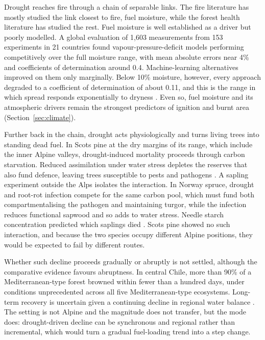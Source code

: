\documentclass[11pt,a4paper]{article}
\begin{document}
Drought reaches fire through a chain of separable links. The fire literature has mostly studied the link closest to fire, fuel moisture, while the forest health literature has studied the rest. Fuel moisture is well established as a driver but poorly modelled. A global evaluation of 1{,}603 measurements from 153 experiments in 21 countries found vapour-pressure-deficit models performing competitively over the full moisture range, with mean absolute errors near 4\% and coefficients of determination around 0.4. Machine-learning alternatives improved on them only marginally. Below 10\% moisture, however, every approach degraded to a coefficient of determination of about 0.11, and this is the range in which spread responds exponentially to dryness \citep{rodrigues_vpdbased_2024}. Even so, fuel moisture and its atmospheric drivers remain the strongest predictors of ignition and burnt area (Section~\ref{sec:climate}).

Further back in the chain, drought acts physiologically and turns living trees into standing dead fuel. In Scots pine at the dry margins of its range, which include the inner Alpine valleys, drought-induced mortality proceeds through carbon starvation. Reduced assimilation under water stress depletes the reserves that also fund defence, leaving trees susceptible to pests and pathogens \citep{giuggiola_droughtinduced_2010}. A sapling experiment outside the Alps isolates the interaction. In Norway spruce, drought and root-rot infection compete for the same carbon pool, which must fund both compartmentalising the pathogen and maintaining turgor, while the infection reduces functional sapwood and so adds to water stress. Needle starch concentration predicted which saplings died \citep{gomezgallego_interaction_2022}. Scots pine showed no such interaction, and because the two species occupy different Alpine positions, they would be expected to fail by different routes.

Whether such decline proceeds gradually or abruptly is not settled, although the comparative evidence favours abruptness. In central Chile, more than 90\% of a Mediterranean-type forest browned within fewer than a hundred days, under conditions unprecedented across all five Mediterranean-type ecosystems. Long-term recovery is uncertain given a continuing decline in regional water balance \citep{miranda_widespread_2023}. The setting is not Alpine and the magnitude does not transfer, but the mode does: drought-driven decline can be synchronous and regional rather than incremental, which would turn a gradual fuel-loading trend into a step change.
\end{document}
